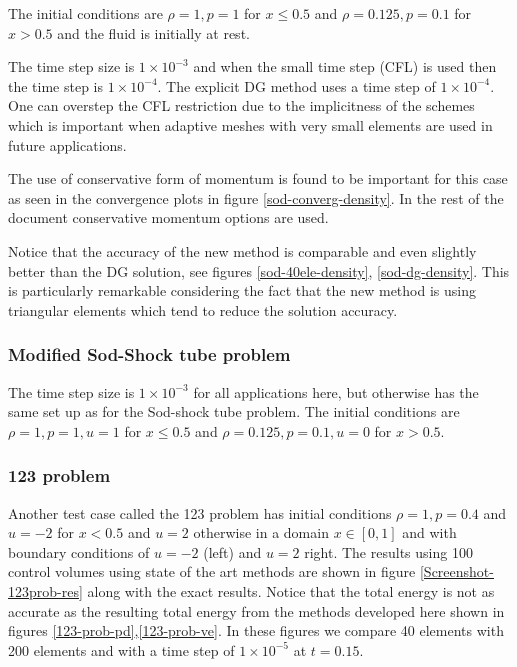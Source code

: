 The initial conditions are $\rho=1, p=1$ for $x\le 0.5$ 
and $\rho=0.125, p=0.1$ for $x> 0.5$ and the fluid 
is initially at rest. 

The time step size is $1\times 10^{-3}$ and when the 
small time step (CFL) is used then the 
time step is $1\times 10^{-4}$. The explicit DG method 
uses a time step of  $1\times 10^{-4}$. 
One can overstep the CFL restriction due to the implicitness 
of the schemes which is important when adaptive meshes 
with very small elements 
are used in future applications.  

The use of conservative form of momentum is found to be important 
for this case as seen in the convergence plots 
in figure \ref{sod-converg-density}. 
In the rest of the document conservative momentum options  
are used. 

Notice that the accuracy of the new method is comparable 
and even slightly better than the DG solution, see figures 
\ref{sod-40ele-density}, \ref{sod-dg-density}. This is 
particularly remarkable considering the fact that the new 
method is using triangular elements which tend to reduce 
the solution accuracy. 

\subsubsection{Modified Sod-Shock tube problem} 

The time step size is $1\times 10^{-3}$ for all applications 
here, but otherwise has the same set up as for the Sod-shock tube problem.
The initial conditions are $\rho=1, p=1, u=1$ for $x\le 0.5$ 
and $\rho=0.125, p=0.1, u=0$ for $x> 0.5$. 

\subsubsection{123 problem} 

Another test case called the 123 problem has initial 
conditions $\rho=1, p=0.4$ and $u=-2$ for $x< 0.5$ and 
$u=2$ otherwise in a domain 
$x \in [0,1]$ 
and 
with boundary conditions of $u=-2$ (left) and $u=2$ right. 
The results using 100 control volumes using state 
of the art methods are shown in 
figure \ref{Screenshot-123prob-res} along with the 
exact results. Notice that the total energy is 
not as accurate as the resulting total 
energy from the methods developed here shown in figures 
\ref{123-prob-pd},\ref{123-prob-ve}. In these figures we 
compare 40 elements with 200 elements and with a time step of $1\times 10^{-5}$ 
at $t=0.15$. 



